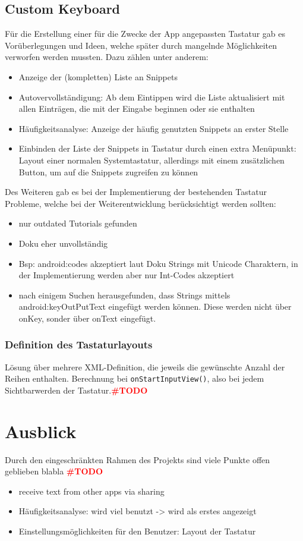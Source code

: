 \documentclass[11pt]{article}
\begin{document}
			
	\subsection{Custom Keyboard}
		Für die Erstellung einer für die Zwecke der App angepassten Tastatur gab es Vorüberlegungen und Ideen, welche später durch mangelnde Möglichkeiten verworfen werden mussten. Dazu zählen unter anderem: 
		\begin{itemize}
			\item Anzeige der (kompletten) Liste an Snippets 
			\item Autovervollständigung: Ab dem Eintippen wird die Liste aktualisiert mit allen Einträgen, die mit der Eingabe beginnen oder sie enthalten
			\item Häufigkeitsanalyse: Anzeige der häufig genutzten Snippets an erster Stelle
			\item Einbinden der Liste der Snippets in Tastatur durch einen extra Menüpunkt: Layout einer normalen Systemtastatur, allerdings mit einem zusätzlichen Button, um auf die Snippets zugreifen zu können
		\end{itemize}
		
		Des Weiteren gab es bei der Implementierung der bestehenden Tastatur Probleme, welche bei der Weiterentwicklung berücksichtigt werden sollten:
		\begin{itemize}
			\item nur outdated Tutorials gefunden
			\item Doku eher unvollständig
			\item Bsp: android:codes akzeptiert laut Doku Strings mit Unicode Charaktern, in der Implementierung werden aber nur Int-Codes akzeptiert
			\item nach einigem Suchen herausgefunden, dass Strings mittels android:keyOutPutText eingefügt werden können. Diese werden nicht über onKey, sonder über onText eingefügt.
		\end{itemize}
		\subsubsection{Definition des Tastaturlayouts}
			Lösung über mehrere XML-Definition, die jeweils die gewünschte Anzahl der Reihen enthalten. Berechnung bei \lstinline|onStartInputView()|, also bei jedem Sichtbarwerden der Tastatur.\textcolor{red}{\textbf{{\LARGE \#TODO}}}
	
\section{Ausblick}
	Durch den eingeschränkten Rahmen des Projekts sind viele Punkte offen geblieben blabla \textcolor{red}{\textbf{{\LARGE \#TODO}}}
	\begin{itemize}
		\item receive text from other apps via sharing
		\item Häufigkeitsanalyse: wird viel benutzt -> wird als erstes angezeigt
		\item Einstellungsmöglichkeiten für den Benutzer: Layout der Tastatur
	\end{itemize}
	
\end{document}
